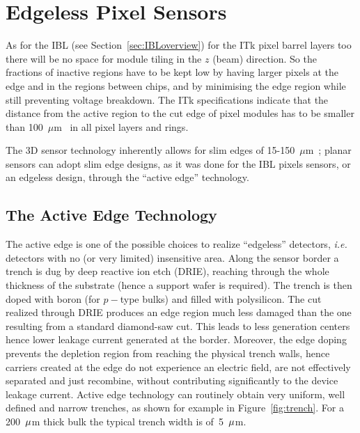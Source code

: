 \section{Edgeless Pixel Sensors}
\label{sec:edgeless}

As for the IBL (see Section~\ref{sec:IBLoverview}) for the ITk pixel barrel layers too there will be no 
space for module tiling in the $z$ (beam) direction. So the fractions of inactive regions have to be kept 
low by having larger pixels at the edge and in the regions between chips, and by minimising the edge 
region while still preventing voltage breakdown. 
 The ITk specifications indicate that the distance from the active region to the cut edge of pixel modules has to be smaller than 100~$\mu$m~\cite{ITkStripsTDR} in all pixel layers and rings.



The 3D sensor technology inherently allows for slim edges of 15-150~$\mu$m~\cite{1748-0221-10-03-C03031}; planar sensors can adopt slim edge designs, as it was done for the IBL pixels sensors, or 
an edgeless design, through the ``active edge'' technology.

\subsection{The Active Edge Technology}

The active edge is one of the possible choices to realize ``edgeless'' detectors, {\it i.e.} detectors with no (or very limited) insensitive area. Along the sensor border a trench is dug by deep reactive ion etch (DRIE), reaching through the whole thickness of the substrate (hence a support wafer is required).  The  trench is then doped with boron (for $p-$type bulks) and  filled with polysilicon. The cut realized through DRIE produces an edge region
much less damaged than the one resulting from a standard diamond-saw cut. This leads to less generation centers hence lower leakage current generated at the border. Moreover, the edge doping prevents the depletion region from reaching the physical trench walls, hence carriers created at the edge  do not experience an electric field, are not effectively separated and just recombine, without contributing significantly to the device leakage current.
Active edge technology can routinely obtain very uniform, well defined and narrow trenches, as shown for example in Figure~\ref{fig:trench}. For a 200~${\rm \mu}$m thick bulk the typical trench width is of~5~${\rm \mu}$m.

